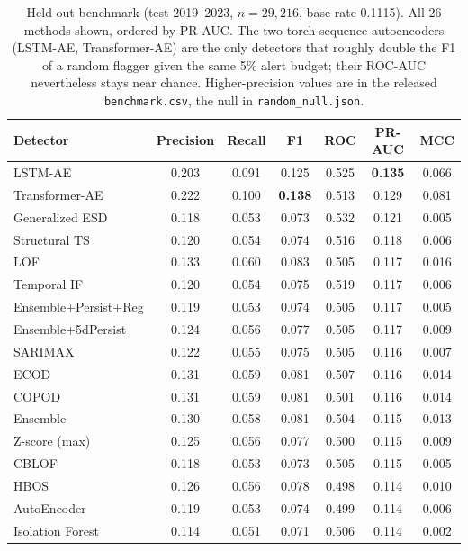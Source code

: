 \documentclass[preprint,12pt]{elsarticle}
\begin{document}
\begin{table}[h]
\centering\small
\caption{Held-out benchmark (test 2019--2023, $n=29{,}216$, base rate 0.1115).
All 26 methods shown, ordered by PR-AUC. The two torch sequence autoencoders
(LSTM-AE, Transformer-AE) are the only detectors that roughly double the F1 of a
random flagger given the same 5\% alert budget; their ROC-AUC nevertheless stays
near chance. Higher-precision values are in the released
\texttt{benchmark.csv}, the null in \texttt{random\_null.json}.}
\label{tab:benchmark}
\begin{tabular}{lcccccc}
\toprule
Detector & Precision & Recall & F1 & ROC & PR-AUC & MCC \\
\midrule
LSTM-AE             & 0.203 & 0.091 & 0.125 & 0.525 & \textbf{0.135} & 0.066 \\
Transformer-AE      & 0.222 & 0.100 & \textbf{0.138} & 0.513 & 0.129 & 0.081 \\
Generalized ESD       & 0.118 & 0.053 & 0.073 & 0.532 & 0.121 & 0.005 \\
Structural TS         & 0.120 & 0.054 & 0.074 & 0.516 & 0.118 & 0.006 \\
LOF                   & 0.133 & 0.060 & 0.083 & 0.505 & 0.117 & 0.016 \\
Temporal IF           & 0.120 & 0.054 & 0.075 & 0.519 & 0.117 & 0.006 \\
Ensemble+Persist+Reg  & 0.119 & 0.053 & 0.074 & 0.505 & 0.117 & 0.005 \\
Ensemble+5dPersist    & 0.124 & 0.056 & 0.077 & 0.505 & 0.117 & 0.009 \\
SARIMAX               & 0.122 & 0.055 & 0.075 & 0.505 & 0.116 & 0.007 \\
ECOD                  & 0.131 & 0.059 & 0.081 & 0.507 & 0.116 & 0.014 \\
COPOD                 & 0.131 & 0.059 & 0.081 & 0.501 & 0.116 & 0.014 \\
Ensemble              & 0.130 & 0.058 & 0.081 & 0.504 & 0.115 & 0.013 \\
Z-score (max)         & 0.125 & 0.056 & 0.077 & 0.500 & 0.115 & 0.009 \\
CBLOF                 & 0.118 & 0.053 & 0.073 & 0.505 & 0.115 & 0.005 \\
HBOS                  & 0.126 & 0.056 & 0.078 & 0.498 & 0.114 & 0.010 \\
AutoEncoder           & 0.119 & 0.053 & 0.074 & 0.499 & 0.114 & 0.006 \\
Isolation Forest      & 0.114 & 0.051 & 0.071 & 0.506 & 0.114 & 0.002 \\

\end{tabular}
\end{table}
\end{document}
